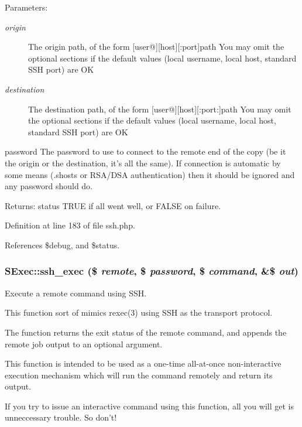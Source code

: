 \begin{Desc}
\item[Parameters:]
\begin{description}
\item[{\em origin}]The origin path, of the form [user@][host][:port]path You may omit the optional sections if the default values (local username, local host, standard SSH port) are OK\item[{\em destination}]The destination path, of the form [user@][host][:port:]path You may omit the optional sections if the default values (local username, local host, standard SSH port) are OK\end{description}
\end{Desc}
password The password to use to connect to the remote end of the copy (be it the origin or the destination, it's all the same). If connection is automatic by some means (.shosts or RSA/DSA authentication) then it should be ignored and any password should do.

\begin{Desc}
\item[Returns:]status TRUE if all went well, or FALSE on failure. \end{Desc}


Definition at line 183 of file ssh.php.

References \$debug, and \$status.
\subsubsection{\setlength{\rightskip}{0pt plus 5cm}SExec::ssh\_\-exec (\$ {\em remote}, \$ {\em password}, \$ {\em command}, \&\$ {\em out})}\label{classSExec_a3}


Execute a remote command using SSH. 

This function sort of mimics rexec(3) using SSH as the transport protocol.

The function returns the exit status of the remote command, and appends the remote job output to an optional argument.

This function is intended to be used as a one-time all-at-once non-interactive execution mechanism which will run the command remotely and return its output.

If you try to issue an interactive command using this function, all you will get is unneccessary trouble. So don't!

